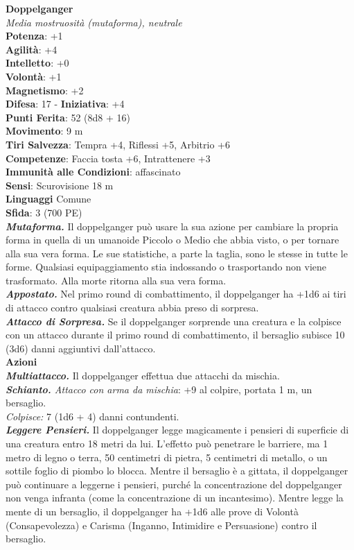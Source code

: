 \begin{multicols}{2}
\medskip\textbf{Doppelganger}\\
\emph{Media mostruosità (mutaforma), neutrale}\\
\textbf{Potenza}: +1\\
\textbf{Agilità}: +4\\
\textbf{Intelletto}: +0\\
\textbf{Volontà}: +1\\
\textbf{Magnetismo}: +2\\
\textbf{Difesa}: 17 - \textbf{Iniziativa}: +4\\
\textbf{Punti Ferita}: 52 (8d8 + 16)\\
\textbf{Movimento}: 9 m\\
\textbf{Tiri Salvezza}: Tempra +4, Riflessi +5, Arbitrio +6\\
\textbf{Competenze}: Faccia tosta +6, Intrattenere +3\\
\textbf{Immunità alle Condizioni}: affascinato\\
\textbf{Sensi}: Scurovisione 18 m\\
\textbf{Linguaggi} Comune\\
\textbf{Sfida}: 3 (700 PE)\smallskip\\
\emph{\textbf{Mutaforma.}} Il doppelganger può usare la sua azione per cambiare la propria forma in quella di un umanoide Piccolo o Medio che abbia visto, o per tornare alla sua vera forma. Le sue statistiche, a parte la taglia, sono le stesse in tutte le forme. Qualsiasi equipaggiamento stia indossando o trasportando non viene trasformato.  Alla morte ritorna alla sua vera forma.\\
\emph{\textbf{Appostato.}} Nel primo round di combattimento, il doppelganger ha +1d6 ai tiri di attacco contro qualsiasi creatura abbia preso di sorpresa.\\
\emph{\textbf{Attacco di Sorpresa.}} Se il doppelganger sorprende una creatura e la colpisce con un attacco durante il primo round di combattimento, il bersaglio subisce 10 (3d6) danni aggiuntivi dall'attacco.\\
\smallskip\textbf{Azioni}\\
\emph{\textbf{Multiattacco.}} Il doppelganger effettua due attacchi da mischia.\\
\emph{\textbf{Schianto.} Attacco con arma da mischia}: +9 al colpire, portata 1 m, un bersaglio.\\
\emph{Colpisce:} 7 (1d6 + 4) danni contundenti.\\
\emph{\textbf{Leggere Pensieri.}} Il doppelganger legge magicamente i pensieri di superficie di una creatura entro 18 metri da lui. L'effetto può penetrare le barriere, ma 1 metro di legno o terra, 50 centimetri di pietra, 5 centimetri di metallo, o un sottile foglio di piombo lo blocca. Mentre il bersaglio è a gittata, il doppelganger può continuare a leggerne i pensieri, purché la concentrazione del doppelganger non venga infranta (come la concentrazione di un incantesimo). Mentre legge la mente di un bersaglio, il doppelganger ha +1d6 alle prove di Volontà (Consapevolezza) e Carisma (Inganno, Intimidire e Persuasione) contro il bersaglio.\\

\end{multicols}
